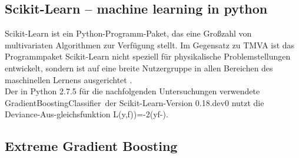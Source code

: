 \subsection{Scikit-Learn -- machine learning in python}
\label{ch:Algorithmen:subsec:sklearn}

Scikit-Learn ist ein Python-Programm-Paket, das eine Gro\ss zahl von multivariaten Algorithmen zur Verf\"ugung stellt. Im Gegensatz zu TMVA ist das Programmpaket Scikit-Learn nicht speziell f\"ur physikalische Problemstellungen entwickelt, sondern ist auf eine breite Nutzergruppe in allen Bereichen des maschinellen Lernens ausgerichtet \cite{DBLP:journals/corr/abs-1201-0490}.\\
Der in Python 2.7.5 f\"ur die nachfolgenden Untersuchungen verwendete \glqq GradientBoostingClassifier\grqq~der Scikit-Learn-Version 0.18.dev0 nutzt die \glqq Deviance\grqq-Aus-gleichsfunktion
\beq
L\left(y,f)\right)=-2\left(y\cdot f-\right).
\label{eq:deviance}
\eeq

\subsection{Extreme Gradient Boosting}
\label{ch:Algorithmen:subsec:XGB}

